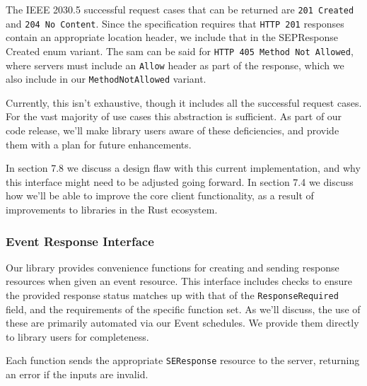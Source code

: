 The IEEE 2030.5 successful request cases that can be returned are \texttt{201 Created} and \texttt{204 No Content}. Since the specification requires that \texttt{HTTP 201} responses contain an appropriate location header, we include that in the SEPResponse Created enum variant. The sam can be said for \texttt{HTTP 405 Method Not Allowed}, where servers must include an \texttt{Allow} header as part of the response, which we also include in our \texttt{MethodNotAllowed} variant.

Currently, this isn't exhaustive, though it includes all the successful request cases. For the vast majority of use cases this abstraction is sufficient. As part of our code release, we'll make library users aware of these deficiencies, and provide them with a plan for future enhancements.

In section 7.8 we discuss a design flaw with this current implementation, and why this interface might need to be adjusted going forward. In section 7.4 we discuss how we'll be able to improve the core client functionality, as a result of improvements to libraries in the Rust ecosystem.

\subsubsection{Event Response Interface}

Our library provides convenience functions for creating and sending response resources when given an event resource. This interface includes checks to ensure the provided response status matches up with that of the \texttt{ResponseRequired} field, and the requirements of the specific function set. As we'll discuss, the use of these are primarily automated via our Event schedules. We provide them directly to library users for completeness.

Each function sends the appropriate \texttt{SEResponse} resource to the server, returning an error if the inputs are invalid.


